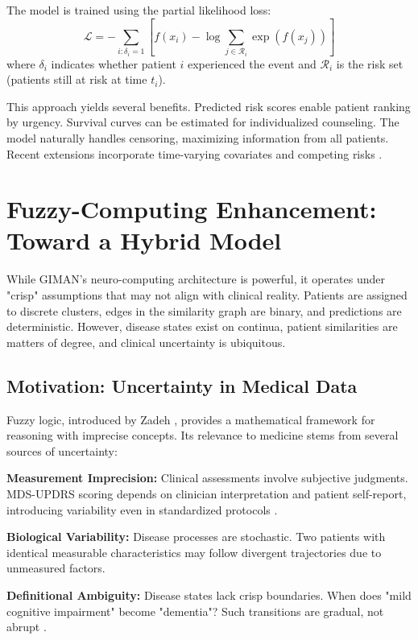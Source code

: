 \documentclass[conference]{IEEEtran}
\begin{document}
The model is trained using the partial likelihood loss:
\begin{equation}
\mathcal{L} = -\sum_{i: \delta_i=1} \left[f(x_i) - \log\sum_{j \in \mathcal{R}_i} \exp(f(x_j))\right]
\end{equation}
where $\delta_i$ indicates whether patient $i$ experienced the event and $\mathcal{R}_i$ is the risk set (patients still at risk at time $t_i$).

This approach yields several benefits. Predicted risk scores enable patient ranking by urgency. Survival curves can be estimated for individualized counseling. The model naturally handles censoring, maximizing information from all patients. Recent extensions incorporate time-varying covariates and competing risks \cite{lee2018deephit}.

\section{Fuzzy-Computing Enhancement: Toward a Hybrid Model}

While GIMAN's neuro-computing architecture is powerful, it operates under "crisp" assumptions that may not align with clinical reality. Patients are assigned to discrete clusters, edges in the similarity graph are binary, and predictions are deterministic. However, disease states exist on continua, patient similarities are matters of degree, and clinical uncertainty is ubiquitous.

\subsection{Motivation: Uncertainty in Medical Data}

Fuzzy logic, introduced by Zadeh \cite{zadeh1965fuzzy}, provides a mathematical framework for reasoning with imprecise concepts. Its relevance to medicine stems from several sources of uncertainty:

\textbf{Measurement Imprecision:} Clinical assessments involve subjective judgments. MDS-UPDRS scoring depends on clinician interpretation and patient self-report, introducing variability even in standardized protocols \cite{goetz2008movement}.

\textbf{Biological Variability:} Disease processes are stochastic. Two patients with identical measurable characteristics may follow divergent trajectories due to unmeasured factors.

\textbf{Definitional Ambiguity:} Disease states lack crisp boundaries. When does "mild cognitive impairment" become "dementia"? Such transitions are gradual, not abrupt \cite{dubois2014advancing}.
\end{document}
